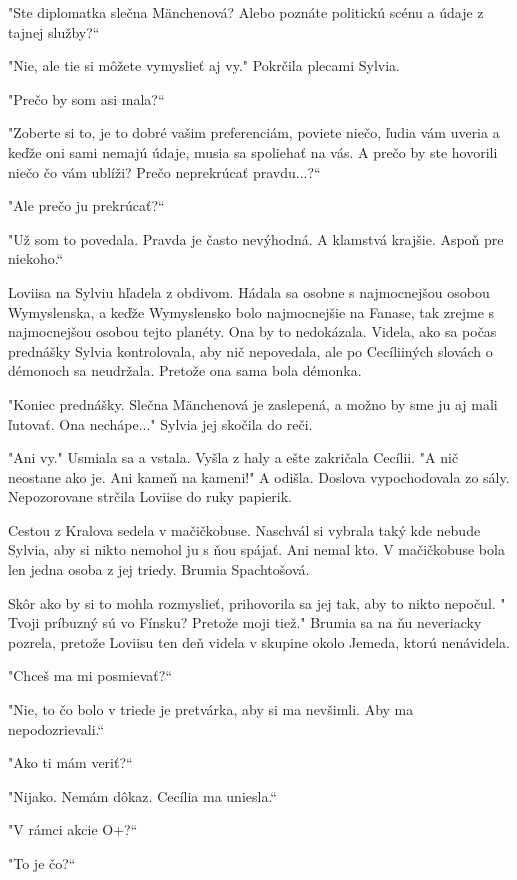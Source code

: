 \documentclass{book}
\begin{document}
"$ $Ste diplomatka slečna Mänchenová? Alebo poznáte politickú scénu a údaje z tajnej služby?“

"$ $Nie, ale tie si môžete vymyslieť aj vy."$ $ Pokrčila plecami Sylvia.

"$ $Prečo by som asi mala?“

"$ $Zoberte si to, je to dobré vašim preferenciám, poviete niečo, ľudia vám uveria a keďže oni sami nemajú údaje, musia sa spoliehať na vás. A prečo by ste hovorili niečo čo vám ublíži? Prečo neprekrúcať pravdu...?“

"$ $Ale prečo ju prekrúcať?“

"$ $Už som to povedala. Pravda je často nevýhodná. A klamstvá krajšie. Aspoň pre niekoho.“

Loviisa na Sylviu hľadela z obdivom. Hádala sa osobne s najmocnejšou osobou Wymyslenska, a keďže Wymyslensko bolo najmocnejšie na Fanase, tak zrejme s najmocnejšou osobou tejto planéty. Ona by to nedokázala. Videla, ako sa počas prednášky Sylvia kontrolovala, aby nič nepovedala, ale po Cecíliiných slovách o démonoch sa neudržala. Pretože ona sama bola démonka.

"$ $Koniec prednášky. Slečna Mänchenová je zaslepená, a možno by sme ju aj mali ľutovať. Ona nechápe..."$ $ Sylvia jej skočila do reči.

"$ $Ani vy."$ $ Usmiala sa a vstala. Vyšla z haly a ešte zakričala Cecílii. "$ $A nič neostane ako je. Ani kameň na kameni!"$ $ A odišla. Doslova vypochodovala zo sály. Nepozorovane strčila Loviise do ruky papierik.

Cestou z Kralova sedela v mačičkobuse. Naschvál si vybrala taký kde nebude Sylvia, aby si nikto nemohol ju s ňou spájať. Ani nemal kto. V mačičkobuse bola len jedna osoba z jej triedy. Brumia Spachtošová.

Skôr ako by si to mohla rozmyslieť, prihovorila sa jej tak, aby to nikto nepočul. "$ $Tvoji príbuzný sú vo Fínsku? Pretože moji tiež."$ $ Brumia sa na ňu neveriacky pozrela, pretože Loviisu ten deň videla v skupine okolo Jemeda, ktorú nenávidela.

"$ $Chceš ma mi posmievať?“

"$ $Nie, to čo bolo v triede je pretvárka, aby si ma nevšimli. Aby ma nepodozrievali.“

"$ $Ako ti mám veriť?“

"$ $Nijako. Nemám dôkaz. Cecília ma uniesla.“

"$ $V rámci akcie O+?“

"$ $To je čo?“
\end{document}
